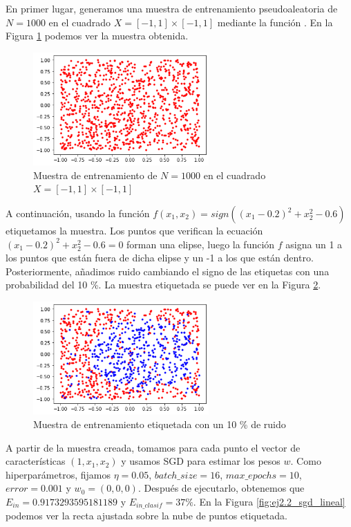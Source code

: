 \documentclass[10pt,a4paper]{article}
\begin{document}
En primer lugar, generamos una muestra de entrenamiento pseudoaleatoria de $N = 1000$ en el cuadrado $X = [-1,1] \times [-1,1]$ mediante la función . En la Figura \ref{fig:ej2.2_muestra} podemos ver la muestra obtenida.

\begin{figure}[h]
	\centering
	\includegraphics[width=0.6\textwidth]{ej2.2_muestra}
	\caption{Muestra de entrenamiento de $N = 1000$ en el cuadrado $X = [-1,1] \times [-1,1]$}
	\label{fig:ej2.2_muestra}
\end{figure}

A continuación, usando la función $f(x_1,x_2) = sign((x_1-0.2)^2 + x_2^2 - 0.6)$ etiquetamos la muestra. Los puntos que verifican la ecuación $(x_1-0.2)^2 + x_2^2 - 0.6 = 0$ forman una elipse, luego la función $f$ asigna un 1 a los puntos que están fuera de dicha elipse y un -1 a los que están dentro. Posteriormente, añadimos ruido cambiando el signo de las etiquetas con una probabilidad del 10 \%. La muestra etiquetada se puede ver en la Figura \ref{fig:ej2.2_muestra_etiquetada}.

\begin{figure}[h]
	\centering
	\includegraphics[width=0.6\textwidth]{ej2.2_muestra_etiquetada}
	\caption{Muestra de entrenamiento etiquetada con un 10 \% de ruido}
	\label{fig:ej2.2_muestra_etiquetada}
\end{figure}

A partir de la muestra creada, tomamos para cada punto el vector de características $(1,x_1,x_2)$ y usamos SGD para estimar los pesos $w$. Como hiperparámetros, fijamos $\eta = 0.05$, $batch\_size = 16$, $max\_epochs = 10$, 
$error = 0.001$ y $w_0 = (0,0,0)$. Después de ejecutarlo, obtenemos que $E_{in} = 0.9173293595181189$ y $E_{in\_clasif} = 37 \%$. En la Figura \ref{fig:ej2.2_sgd_lineal} podemos ver la recta ajustada sobre la nube de puntos etiquetada.
\end{document}
